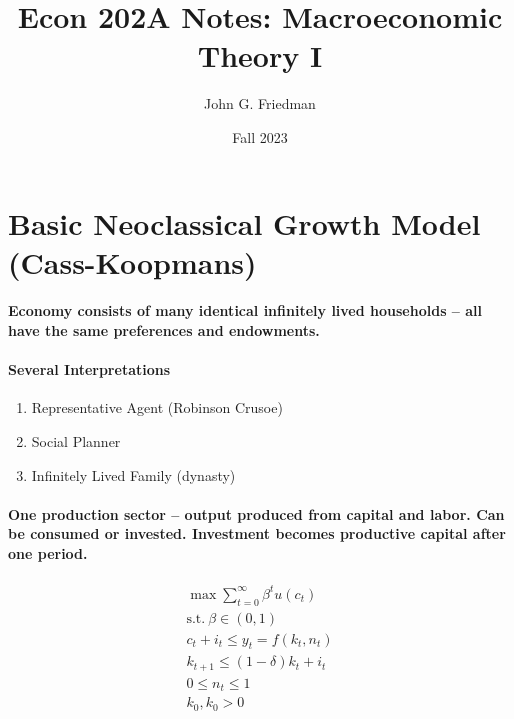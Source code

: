 \documentclass{article}
\begin{document}
\title{Econ 202A Notes: Macroeconomic Theory I}
\author{John G. Friedman}
\date{Fall 2023}
\maketitle

\section{Basic Neoclassical Growth Model (Cass-Koopmans)}
\paragraph{Economy consists of many identical infinitely 
lived households -- all have the same preferences and endowments.}

\paragraph{Several Interpretations}
\begin{enumerate}
    \item Representative Agent (Robinson Crusoe)
    \item Social Planner
    \item Infinitely Lived Family (dynasty)
\end{enumerate}

\paragraph{One production sector -- output produced from capital and labor. 
Can be consumed or invested. Investment becomes productive capital 
after one period.}

\[
    \begin{aligned}
        \max_{} \sum_{t=0}^\infty \beta^t u(c_t)\\
        \text{s.t.}\ \beta \in (0,1)\\
        c_t + i_t \leq y_t = f(k_t, n_t)\\
        k_{t+1} \leq (1 - \delta) k_t + i_t\\
        0 \leq n_t \leq 1\\
        k_0, k_0 > 0
    \end{aligned}
\]
\end{document}
